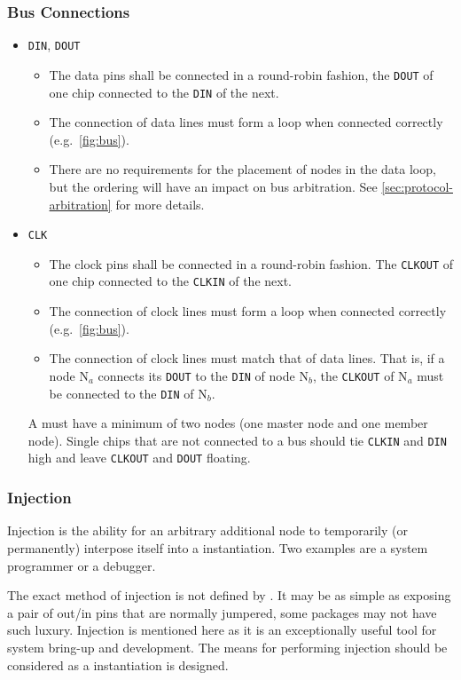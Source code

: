 \subsubsection{Bus Connections}
\label{sec:physical-bus}
\begin{itemize}
  \item {\tt DIN}, {\tt DOUT}
  \begin{itemize}
    \item The data pins shall be connected in a round-robin fashion, the
      {\tt DOUT} of one chip connected to the {\tt DIN} of the next.
    \item The connection of data lines must form a loop when connected
      correctly (e.g.~\cref{fig:bus}).
    \item There are no requirements for the placement of nodes in the data
      loop, but the ordering will have an impact on bus arbitration. See
      \cref{sec:protocol-arbitration} for more details.
  \end{itemize}
  \item {\tt CLK}
  \begin{itemize}
    \item The clock pins shall be connected in a round-robin fashion. The
      {\tt CLKOUT} of one chip connected to the {\tt CLKIN} of the next.
    \item The connection of clock lines must form a loop when connected
      correctly (e.g.~\cref{fig:bus}).
    \item The connection of clock lines must match that of data lines. That
      is, if a node N$_{a}$ connects its {\tt DOUT} to the {\tt DIN} of node
      N$_{b}$, the {\tt CLKOUT} of N$_{a}$ must be connected to the {\tt DIN}
      of N$_{b}$.
  \end{itemize}
  A \bus must have a minimum of two nodes (one master node and one
  member node). Single chips that are not connected to a bus should tie
  {\tt CLKIN} and {\tt DIN} high and leave {\tt CLKOUT} and {\tt DOUT}
  floating.
\end{itemize}


\subsubsection{Injection}
Injection is the ability for an arbitrary additional node to temporarily (or
permanently) interpose itself into a \bus instantiation. Two examples are a
system programmer or a debugger.

The exact method of injection is not defined by \bus. It may be as simple as
exposing a pair of out/in pins that are normally jumpered, some packages may
not have such luxury. Injection is mentioned here as it is an exceptionally
useful tool for system bring-up and development. The means for performing
injection should be considered as a \bus instantiation is designed.

